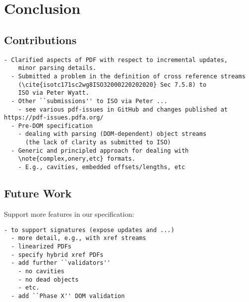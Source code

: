 \section{Conclusion }
\label{sec:conclusion}

\subsection{Contributions}

\begin{lstlisting}[style=meta]
  - Clarified aspects of PDF with respect to incremental updates,
    minor parsing details.
  - Submitted a problem in the definition of cross reference streams
    (\cite{isotc171sc2wg8ISO32000220202020} Sec 7.5.8) to
    ISO via Peter Wyatt.
  - Other ``submissions'' to ISO via Peter ...
    - see various pdf-issues in GitHub and changes published at https://pdf-issues.pdfa.org/
  - Pre-DOM specification
    - dealing with parsing (DOM-dependent) object streams
      (the lack of clarity as submitted to ISO)
  - Generic and principled approach for dealing with
    \note{complex,onery,etc} formats.
    - E.g., cavities, embedded offsets/lengths, etc
\end{lstlisting}

\subsection{Future Work}

Support more features in our specification:
\begin{lstlisting}[style=meta]
  - to support signatures (expose updates and ...)
  - more detail, e.g., with xref streams
  - linearized PDFs
  - specify hybrid xref PDFs
  - add further ``validators''
    - no cavities
    - no dead objects
    - etc.
  - add ``Phase X'' DOM validation
\end{lstlisting}

